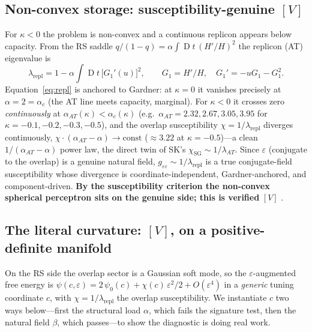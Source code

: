 \documentclass[a4paper,11pt]{article}
\theoremstyle{plain}
\theoremstyle{definition}
\theoremstyle{remark}
\newcommand{\eps}{\varepsilon}
\newcommand{\repl}{\lambda_{\mathrm{repl}}}
\DeclareMathOperator{\Dz}{D}
\begin{document}
\subsection{Non-convex storage: susceptibility-genuine $[V]$}\label{sec:perc-chi}
For $\kappa<0$ the problem is non-convex and a continuous replicon appears below capacity. From the RS saddle
$q/(1-q)=\alpha\int\Dz t\,(H'/H)^2$ the replicon (AT) eigenvalue is
\begin{equation}
\repl=1-\alpha\int \Dz t\,\big[G_1'(u)\big]^2,\qquad G_1=H'/H,\quad G_1'=-uG_1-G_1^2.
\label{eq:repl}
\end{equation}
Equation~\eqref{eq:repl} is anchored to Gardner: at $\kappa=0$ it vanishes precisely at $\alpha=2=\alpha_c$
(the AT line meets capacity, marginal). For $\kappa<0$ it crosses zero \emph{continuously} at
$\alpha_{AT}(\kappa)<\alpha_c(\kappa)$ (e.g.\ $\alpha_{AT}=2.32,2.67,3.05,3.95$ for
$\kappa=-0.1,-0.2,-0.3,-0.5$), and the overlap susceptibility $\chi=1/\repl$ diverges continuously,
$\chi\cdot(\alpha_{AT}-\alpha)\to\text{const}$ ($\approx3.22$ at $\kappa=-0.5$)---a clean
$1/(\alpha_{AT}-\alpha)$ power law, the direct twin of SK's $\chi_{\mathrm{SG}}\sim1/\lambda_{AT}$. Since
$\eps$ (conjugate to the overlap) is a genuine natural field, $g_{\eps\eps}\sim1/\repl$ is a true
conjugate-field susceptibility whose divergence is coordinate-independent, Gardner-anchored, and
component-driven. \textbf{By the susceptibility criterion the non-convex spherical perceptron sits on the
genuine side; this is verified} $[V]$ \cite[receipt \texttt{module\_L\_perceptron\_replicon.py}]{repo}.

\subsection{The literal curvature: $[V]$, on a positive-definite manifold}\label{sec:perc-R}
On the RS side the overlap sector is a Gaussian soft mode, so the $\eps$-augmented free energy is
$\psi(c,\eps)=2\,\psi_0(c)+\chi(c)\,\eps^2/2+O(\eps^4)$ in a \emph{generic} tuning coordinate $c$, with
$\chi=1/\repl$ the overlap susceptibility. We instantiate $c$ two ways below---first the structural load
$\alpha$, which fails the signature test, then the natural field $\beta$, which passes---to show the
diagnostic is doing real work.
\end{document}
